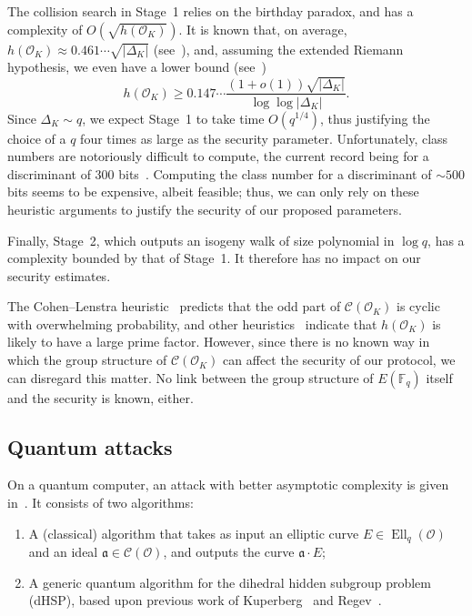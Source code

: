 \documentclass{llncs}
\newcommand{\F}{\mathbb{F}}
\newcommand{\Cl}{\mathcal{C}}
\renewcommand{\O}{\mathcal{O}}
\renewcommand{\frak}{\mathfrak}
\DeclareMathOperator{\Ell}{Ell}
\begin{document}
The collision search in Stage~1 relies on the birthday paradox, and
has a complexity of $O(\sqrt{h(\O_K)})$.
It is known that, on average,
$h(\O_K)≈0.461\cdots\sqrt{|Δ_K|}$ (see~\cite[5.10]{Cohen1993}), and,
assuming the extended Riemann hypothesis, we even have a lower bound
(see~\cite{littlewood1928class})
\[h(\O_K) ≥ 0.147\cdots\frac{(1+o(1))\sqrt{|Δ_K|}}{\log\log|Δ_K|}.\]
Since $Δ_K\sim q$, we expect Stage~1 to take time $O(q^{1/4})$,
thus justifying the choice of a $q$ four times as large as the
security parameter.  Unfortunately, class numbers are notoriously
difficult to compute, the current record being
for a discriminant of 300 bits~\cite{10.1007/978-3-642-14081-5_15}.
Computing the class
number for a discriminant of ${\sim 500}$ bits seems to be expensive,
albeit feasible; thus, we can only rely on these heuristic arguments
to justify the security of our proposed parameters.

Finally, Stage~2,
which outputs an isogeny walk of size polynomial in $\log q$,
has a complexity bounded by that of Stage~1.
It therefore has no impact on our security estimates.

\begin{remark}
  The Cohen--Lenstra heuristic~\cite{10.1007/BFb0099440} predicts that
  the odd part of $\Cl(\O_K)$ is cyclic with overwhelming
  probability, and other heuristics~\cite{10.1007/3-540-44448-3_18}
  indicate that $h(\O_K)$ is likely to have a large prime factor.
  However, since there is no known way in which the group structure of
  $\Cl(\O_K)$ can affect the security of our protocol, we can 
  disregard this matter. No link between the group structure
	of $E(\F_q)$ itself and the security is known, either.
\end{remark}

\subsection{Quantum attacks}
\label{sec:quantum-attacks}

On a quantum computer, an attack with better asymptotic complexity is
given in~\cite{childs2014constructing}. It consists of two algorithms:
\begin{enumerate}
\item A (classical) algorithm that takes as input an elliptic curve
  $E∈\Ell_q(\O)$ and an ideal $\frak a∈\Cl(\O)$, and outputs the curve
  $\frak a·E$;
\item A generic quantum algorithm for the dihedral hidden subgroup
  problem (dHSP), based upon previous work of Kuperberg~\cite{Kup} and
  Regev~\cite{regev04}.
\end{enumerate}
\end{document}
